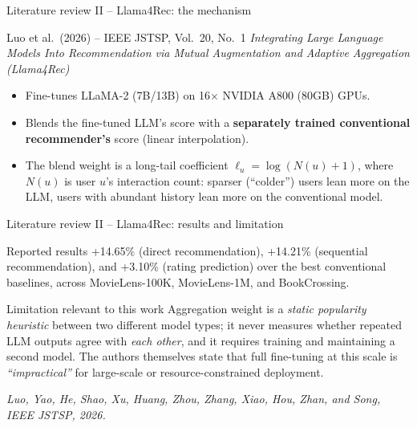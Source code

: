 \documentclass[aspectratio=169,12pt]{beamer}
\newcommand{\source}[1]{\vspace{0.35em}\par{\tiny\color{Muted}\textit{#1}}}
\begin{document}
\begin{frame}{Literature review II -- Llama4Rec: the mechanism}
\begin{block}{Luo et al.\ (2026) -- IEEE JSTSP, Vol.\ 20, No.\ 1}
\emph{Integrating Large Language Models Into Recommendation via Mutual
Augmentation and Adaptive Aggregation (Llama4Rec)}
\end{block}

\vspace{0.6em}
\begin{itemize}
  \item Fine-tunes LLaMA-2 (7B/13B) on 16$\times$ NVIDIA A800 (80GB) GPUs.
  \item Blends the fine-tuned LLM's score with a \textbf{separately trained
        conventional recommender's} score (linear interpolation).
  \item The blend weight is a long-tail coefficient
        $\ell_u = \log(N(u){+}1)$, where $N(u)$ is user $u$'s interaction
        count: sparser (``colder'') users lean more on the LLM, users with
        abundant history lean more on the conventional model.
\end{itemize}
\end{frame}

\begin{frame}{Literature review II -- Llama4Rec: results and limitation}
\begin{block}{Reported results}
+14.65\% (direct recommendation), +14.21\% (sequential recommendation),
and +3.10\% (rating prediction) over the best conventional baselines,
across MovieLens-100K, MovieLens-1M, and BookCrossing.
\end{block}

\vspace{0.5em}
\begin{alertblock}{Limitation relevant to this work}
Aggregation weight is a \emph{static popularity heuristic} between two
different model types; it never measures whether repeated LLM outputs
agree with \emph{each other}, and it requires training and maintaining a
second model. The authors themselves state that full fine-tuning at this
scale is \emph{``impractical''} for large-scale or resource-constrained
deployment.
\end{alertblock}
\source{Luo, Yao, He, Shao, Xu, Huang, Zhou, Zhang, Xiao, Hou, Zhan, and Song, IEEE JSTSP, 2026.}
\end{frame}
\end{document}
